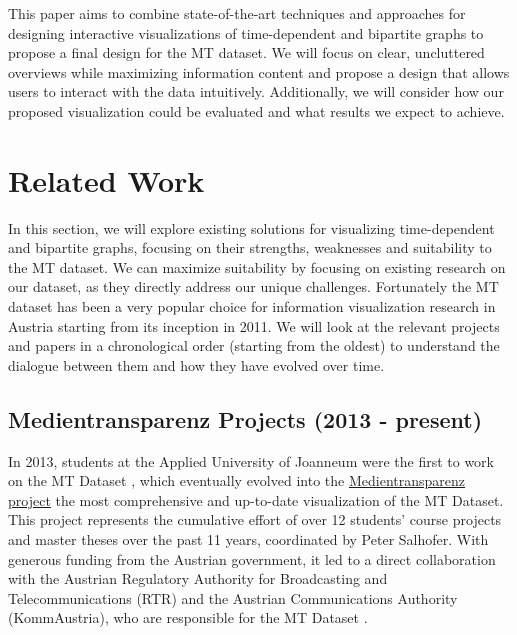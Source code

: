 \documentclass{vgtc}
\begin{document}
\medskip

This paper aims to combine state-of-the-art techniques and approaches for designing interactive visualizations of time-dependent and bipartite graphs to propose a final design for the MT dataset. We will focus on clear, uncluttered overviews while maximizing information content and propose a design that allows users to interact with the data intuitively. Additionally, we will consider how our proposed visualization could be evaluated and what results we expect to achieve.

\section{Related Work} %

In this section, we will explore existing solutions for visualizing time-dependent and bipartite graphs, focusing on their strengths, weaknesses and suitability to the MT dataset.
We can maximize suitability by focusing on existing research on our dataset, as they directly address our unique challenges. Fortunately the MT dataset has been a very popular choice for information visualization research in Austria starting from its inception in 2011. We will look at the relevant projects and papers in a chronological order (starting from the oldest) to understand the dialogue between them and how they have evolved over time.

\subsection{Medientransparenz Projects (2013 - present)}

In 2013, students at the Applied University of Joanneum were the first to work on the MT Dataset \cite{medtrans}, which eventually evolved into the \href{https://visualisierung.medientransparenz.rtr.at/}{Medientransparenz project} \textendash{} the most comprehensive and up-to-date visualization of the MT Dataset. This project represents the cumulative effort of over 12 students' course projects and master theses over the past 11 years, coordinated by Peter Salhofer. With generous funding from the Austrian government, it led to a direct collaboration with the Austrian Regulatory Authority for Broadcasting and Telecommunications (RTR) and the Austrian Communications Authority (KommAustria), who are responsible for the MT Dataset \cite{dataset}.
\end{document}
